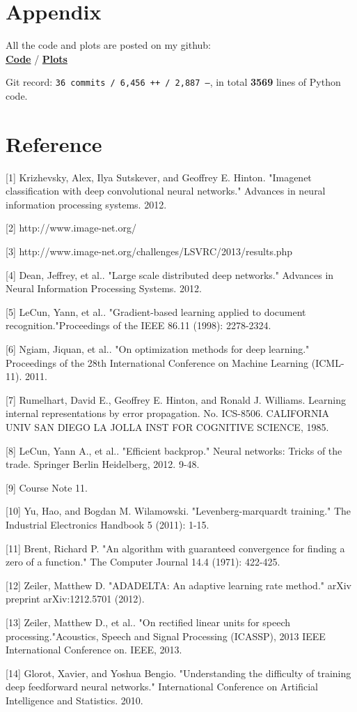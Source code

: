 \documentclass{article} %
\begin{document}
\section*{Appendix}
All the code and plots are posted on my github: \\
\href{https://github.com/zhaojunbo/StarAE}{\bf Code} /  \href{https://github.com/zhaojunbo/StarAE/tree/master/test/optim_proj}{\bf Plots}

Git record: \texttt{36 commits / 6,456 ++ / 2,887 --}, in total \textbf{3569} lines of Python code.

\newpage
\section*{Reference}
\small{
[1] Krizhevsky, Alex, Ilya Sutskever, and Geoffrey E. Hinton. "Imagenet classification with deep convolutional neural networks." Advances in neural information processing systems. 2012.

[2] http://www.image-net.org/

[3] http://www.image-net.org/challenges/LSVRC/2013/results.php

[4] Dean, Jeffrey, et al.. "Large scale distributed deep networks." Advances in Neural Information Processing Systems. 2012.

[5] LeCun, Yann, et al.. "Gradient-based learning applied to document recognition."Proceedings of the IEEE 86.11 (1998): 2278-2324.

[6] Ngiam, Jiquan, et al.. "On optimization methods for deep learning." Proceedings of the 28th International Conference on Machine Learning (ICML-11). 2011.

[7] Rumelhart, David E., Geoffrey E. Hinton, and Ronald J. Williams. Learning internal representations by error propagation. No. ICS-8506. CALIFORNIA UNIV SAN DIEGO LA JOLLA INST FOR COGNITIVE SCIENCE, 1985.

[8] LeCun, Yann A., et al.. "Efficient backprop." Neural networks: Tricks of the trade. Springer Berlin Heidelberg, 2012. 9-48.

[9] Course Note 11.

[10] Yu, Hao, and Bogdan M. Wilamowski. "Levenberg-marquardt training." The Industrial Electronics Handbook 5 (2011): 1-15.

[11] Brent, Richard P. "An algorithm with guaranteed convergence for finding a zero of a function." The Computer Journal 14.4 (1971): 422-425.

[12] Zeiler, Matthew D. "ADADELTA: An adaptive learning rate method." arXiv preprint arXiv:1212.5701 (2012).

[13] Zeiler, Matthew D., et al.. "On rectified linear units for speech processing."Acoustics, Speech and Signal Processing (ICASSP), 2013 IEEE International Conference on. IEEE, 2013.

[14] Glorot, Xavier, and Yoshua Bengio. "Understanding the difficulty of training deep feedforward neural networks." International Conference on Artificial Intelligence and Statistics. 2010.
}
\end{document}
